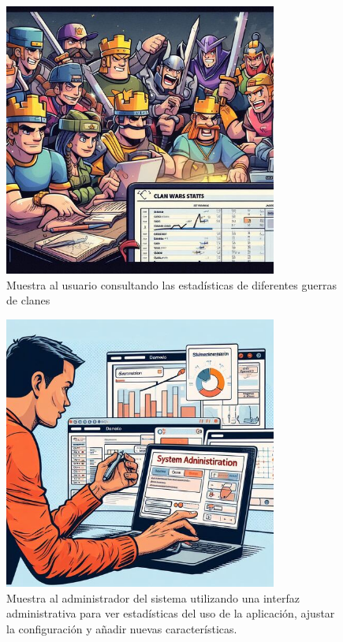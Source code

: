 \begin{figure}[H]
  \centering
  \includegraphics[width=0.8\textwidth]{../images/comic_query_clan_war_stats.jpeg}
  \caption{Muestra al usuario consultando las estadísticas de diferentes guerras de clanes}
\end{figure}

\begin{figure}[H]
  \centering
  \includegraphics[width=0.8\textwidth]{../images/comic_administrator.jpeg}
  \caption{Muestra al administrador del sistema utilizando una interfaz administrativa para ver estadísticas del uso de la aplicación, ajustar la configuración y añadir nuevas características.}
\end{figure}
